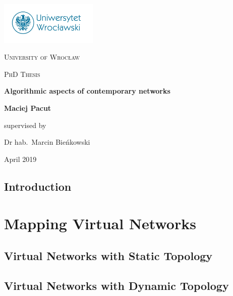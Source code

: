 \documentclass[a4paper,11pt]{book}
\author{Maciej Pacut}
\begin{document}
\begin{titlepage}
	\centering
	\includegraphics[width=0.35\textwidth]{figs/uni-logo.jpg}\par\vspace{1cm}
	{\scshape\LARGE University of Wrocław\par}
	\vspace{3cm}
        {\scshape\Large PhD Thesis\par}
	\vspace{1cm}
        {\huge\bfseries Algorithmic aspects of contemporary networks\par}
	\vspace{3cm}
        {\huge \bfseries Maciej Pacut\par}
	\vfill
	supervised by\par
	Dr hab.~Marcin Bieńkowski

	\vfill

	{\large April 2019 \par}
\end{titlepage}

\newpage
\thispagestyle{empty}
\mbox{}

\tableofcontents


\chapter{Introduction}



\part{Mapping Virtual Networks}
\label{pt:virtual-networks}

\chapter{Virtual Networks with Static Topology}
\label{ch:static-mapping}



\chapter{Virtual Networks with Dynamic Topology}
\label{ch:dynamic-mapping}
\end{document}
